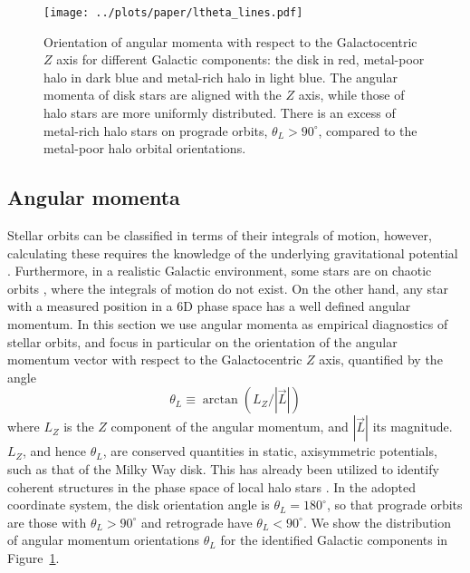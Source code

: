 \documentclass[apj, twocolappendix, numberedappendix, appendixfloats]{emulateapj}
\begin{document}
\begin{figure}
\begin{center}
\texttt{[image: ../plots/paper/ltheta\_lines.pdf]}
\caption{Orientation of angular momenta with respect to the Galactocentric $Z$ axis for different Galactic components: the disk in red, metal-poor halo in dark blue and metal-rich halo in light blue.
The angular momenta of disk stars are aligned with the $Z$ axis, while those of halo stars are more uniformly distributed.
There is an excess of metal-rich halo stars on prograde orbits, $\theta_L>90^\circ$, compared to the metal-poor halo orbital orientations.}
\label{fig:ltheta}
\end{center}
\end{figure}

\subsection{Angular momenta}
\label{sec:l}
Stellar orbits can be classified in terms of their integrals of motion, however, calculating these requires the knowledge of the underlying gravitational potential \citep{bt2008}.
Furthermore, in a realistic Galactic environment, some stars are on chaotic orbits \citep[e.g.,][]{price-whelan2016}, where the integrals of motion do not exist.
On the other hand, any star with a measured position in a 6D phase space has a well defined angular momentum.
In this section we use angular momenta as empirical diagnostics of stellar orbits, and focus in particular on the orientation of the angular momentum vector with respect to the Galactocentric $Z$ axis, quantified by the angle
\begin{equation}
\theta_L \equiv \arctan(L_Z/|\vec{L}|)
\label{eq:thetal}
\end{equation}
where $L_Z$ is the $Z$ component of the angular momentum, and $|\vec{L}|$ its magnitude.
$L_Z$, and hence $\theta_L$, are conserved quantities in static, axisymmetric potentials, such as that of the Milky Way disk.
This has already been utilized to identify coherent structures in the phase space of local halo stars \citep[e.g.,][]{helmi1999, smith2009}.
In the adopted coordinate system, the disk orientation angle is $\theta_L=180^\circ$, so that prograde orbits are those with $\theta_L>90^\circ$ and retrograde have $\theta_L<90^\circ$.
We show the distribution of angular momentum orientations $\theta_L$ for the identified Galactic components in Figure~\ref{fig:ltheta}.
\end{document}
